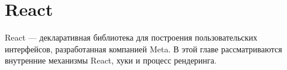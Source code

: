 \chapter{React}

React — декларативная библиотека для построения пользовательских интерфейсов,
разработанная компанией Meta.  В этой главе рассматриваются внутренние
механизмы React, хуки и процесс рендеринга.




